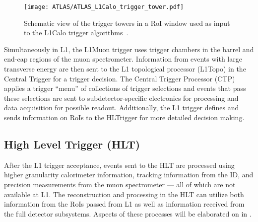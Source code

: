 \begin{figure}[htbp]
 \centering
 \texttt{[image: ATLAS/ATLAS\_L1Calo\_trigger\_tower.pdf]}
 \caption[Schematic view of the trigger towers in a region of interest window used as input to the L1Calo trigger algorithms.]{%
  Schematic view of the trigger towers in a RoI window used as input to the L1Calo trigger algorithms~\cite{TRIG-2016-01}.}\label{fig:ATLAS_L1Calo_trigger_tower}
\end{figure}

Simultaneously in L1, the L1Muon trigger uses trigger chambers in the barrel and end-cap regions of the muon spectrometer.
Information from events with large transverse energy are then sent to the L1 topological processor (L1Topo) in the Central Trigger for a trigger decision.
The Central Trigger Processor (CTP) applies a trigger ``menu'' of collections of trigger selections and events that pass these selections are sent to subdetector-specific electronics for processing and data acquisition for possible readout.
Additionally, the L1 trigger defines and sends information on RoIs to the HLTrigger for more detailed decision making.

\subsection{High Level Trigger (HLT)}\label{sec:ATLAS_HLT}

After the L1 trigger acceptance, events sent to the HLT are processed using higher granularity calorimeter information, tracking information from the ID, and precision measurements from the muon spectrometer --- all of which are not available at L1.
The reconstruction and processing in the HLT can utilize both information from the RoIs passed from L1 as well as information received from the full detector subsystems.
Aspects of these processes will be elaborated on in .
